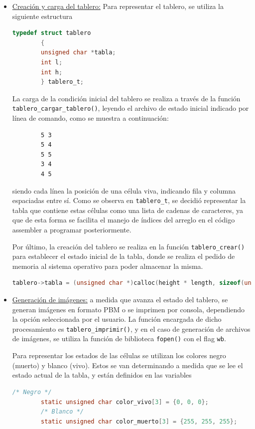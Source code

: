 \documentclass[a4paper,12pt]{article}
\numberwithin{equation}{section}
\numberwithin{figure}{section}
\begin{document}
\begin{itemize}
		\item \underline{Creación y carga del tablero:}
		Para representar el tablero, se utiliza la siguiente estructura
		\begin{lstlisting}[language=C, style=StyleC]
		typedef struct tablero
		{
		unsigned char *tabla;
		int l;
		int h;
		} tablero_t;
		\end{lstlisting}
		
		La carga de la condición inicial del tablero se realiza a través de la función\\ \texttt{tablero\_cargar\_tablero()}, leyendo el archivo de estado inicial indicado por línea de comando, como se muestra a continuación:
		\begin{verbatim}
		5 3
		5 4
		5 5
		3 4
		4 5
		\end{verbatim}
		siendo cada línea la posición de una célula viva, indicando fila y columna espaciadas entre sí.
		Como se observa en \texttt{tablero\_t}, se decidió representar la tabla que contiene estas células como una lista de cadenas de caracteres, ya que de esta forma se facilita el manejo de índices del arreglo en el código assembler a programar posteriormente.
		
		Por último, la creación del tablero se realiza en la función \texttt{tablero\_crear()} para establecer el estado inicial de la tabla, donde se realiza el pedido de memoria al sistema operativo para poder almacenar la misma.
		\begin{lstlisting}[language=C, style=StyleC]
		tablero->tabla = (unsigned char *)calloc(height * length, sizeof(unsigned char));
		\end{lstlisting}
		
		\item \underline{Generación de imágenes:} a medida que avanza el estado del tablero, se generan imágenes en formato PBM o se imprimen por consola, dependiendo la opción seleccionada por el usuario. La función encargada de dicho procesamiento es \texttt{tablero\_imprimir()}, y en el caso de generación de archivos de imágenes, se utiliza la función de biblioteca \texttt{fopen()} con el flag \texttt{wb}. 
		
		Para representar los estados de las células se utilizan los colores negro (muerto) y blanco (vivo). Estos se van determinando a medida que se lee el estado actual de la tabla, y están definidos en las variables
		\begin{lstlisting}[language=C, style=StyleC]
		/* Negro */
		static unsigned char color_vivo[3] = {0, 0, 0};
		/* Blanco */
		static unsigned char color_muerto[3] = {255, 255, 255};
		\end{lstlisting}
		

\end{itemize}
\end{document}
